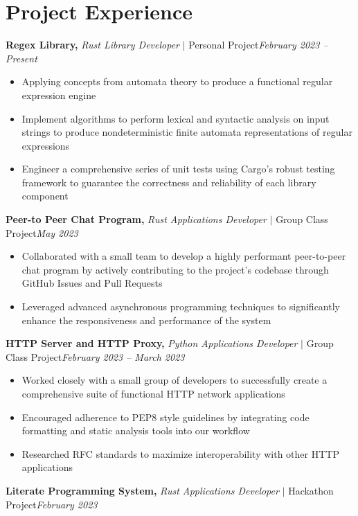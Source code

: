 \documentclass[8pt]{extarticle}
\newcommand{\jobentry}[4]{\textbf{#1,} \textit{#2} \(|\) #3\hfill \textit{#4}}
\begin{document}
\section{Project Experience}

\jobentry{Regex Library}{Rust Library Developer}{Personal Project}{February 2023 -- Present}

\begin{itemize}
  \item{Applying concepts from automata theory to produce a functional regular expression engine}
  \item{Implement algorithms to perform lexical and syntactic analysis on input strings to produce nondeterministic finite automata representations of regular expressions}
  \item{Engineer a comprehensive series of unit tests using Cargo’s robust testing framework to guarantee the correctness and reliability of each library component}
\end{itemize}

\jobentry{Peer-to Peer Chat Program}{Rust Applications Developer}{Group Class Project}{May 2023}

\begin{itemize}
\item{Collaborated with a small team to develop a highly performant peer-to-peer chat program by actively contributing to the project's codebase through GitHub Issues and Pull Requests}
\item{Leveraged advanced asynchronous programming techniques to significantly enhance the responsiveness and performance of the system}
\end{itemize}

\jobentry{HTTP Server and HTTP Proxy}{Python Applications Developer}{Group Class Project}{February 2023 -- March 2023}

\begin{itemize}
  \item{Worked closely with a small group of developers to successfully create a comprehensive suite of functional HTTP network applications}
  \item{Encouraged adherence to PEP8 style guidelines by integrating code formatting and static analysis tools into our workflow}
  \item{Researched RFC standards to maximize interoperability with other HTTP applications}
\end{itemize}

\jobentry{Literate Programming System}{Rust Applications Developer}{Hackathon Project}{February 2023}
\end{document}
